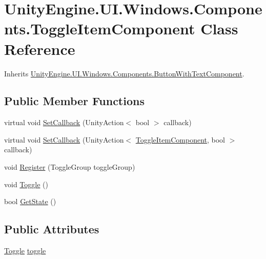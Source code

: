 \hypertarget{class_unity_engine_1_1_u_i_1_1_windows_1_1_components_1_1_toggle_item_component}{}\section{Unity\+Engine.\+U\+I.\+Windows.\+Components.\+Toggle\+Item\+Component Class Reference}
\label{class_unity_engine_1_1_u_i_1_1_windows_1_1_components_1_1_toggle_item_component}


Inherits \hyperlink{class_unity_engine_1_1_u_i_1_1_windows_1_1_components_1_1_button_with_text_component}{Unity\+Engine.\+U\+I.\+Windows.\+Components.\+Button\+With\+Text\+Component}.

\subsection*{Public Member Functions}
\begin{DoxyCompactItemize}
\item 
virtual void \hyperlink{class_unity_engine_1_1_u_i_1_1_windows_1_1_components_1_1_toggle_item_component_a14185860fafe5a3a039aa88753a7a58f}{Set\+Callback} (Unity\+Action$<$ bool $>$ callback)
\item 
virtual void \hyperlink{class_unity_engine_1_1_u_i_1_1_windows_1_1_components_1_1_toggle_item_component_a3de23d8d66adb1c97a2260c5d8f57319}{Set\+Callback} (Unity\+Action$<$ \hyperlink{class_unity_engine_1_1_u_i_1_1_windows_1_1_components_1_1_toggle_item_component}{Toggle\+Item\+Component}, bool $>$ callback)
\item 
void \hyperlink{class_unity_engine_1_1_u_i_1_1_windows_1_1_components_1_1_toggle_item_component_a2223b81ce7993b65fa1e0c826670533e}{Register} (Toggle\+Group toggle\+Group)
\item 
void \hyperlink{class_unity_engine_1_1_u_i_1_1_windows_1_1_components_1_1_toggle_item_component_a174d1ee8ad21c4d1356586d76b8af411}{Toggle} ()
\item 
bool \hyperlink{class_unity_engine_1_1_u_i_1_1_windows_1_1_components_1_1_toggle_item_component_abd285f5bc45a94eac33dc1dd5dc63f50}{Get\+State} ()
\end{DoxyCompactItemize}
\subsection*{Public Attributes}
\begin{DoxyCompactItemize}
\item 
\hyperlink{class_unity_engine_1_1_u_i_1_1_windows_1_1_components_1_1_toggle_item_component_a174d1ee8ad21c4d1356586d76b8af411}{Toggle} \hyperlink{class_unity_engine_1_1_u_i_1_1_windows_1_1_components_1_1_toggle_item_component_a2fd1c67c713e25927ff2c90452d57ce2}{toggle}
\end{DoxyCompactItemize}
